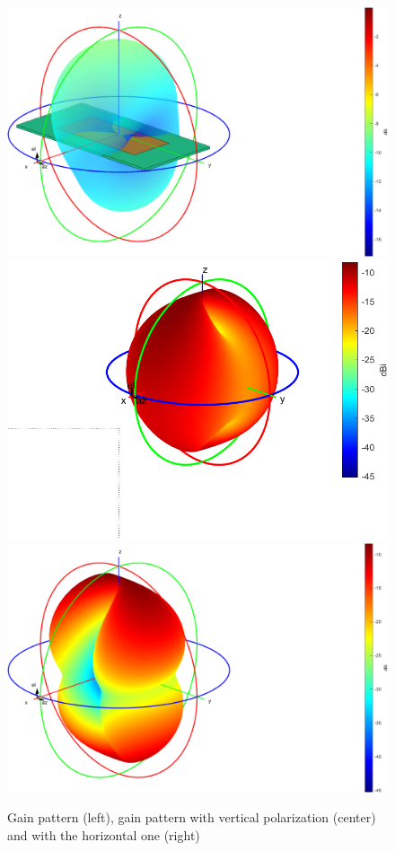 \documentclass[12pt,a4paper]{article}
\begin{document}
{\begin{center}
\begin{figure}
\includegraphics[width = 0.3\linewidth]{gain_patch.png}
\includegraphics[width = 0.3\linewidth]{gain_patch_v.png}
\includegraphics[width = 0.3\linewidth]{gain_patch_h.png}
\caption{Gain pattern (left), gain pattern with vertical polarization (center) and with the horizontal one (right)}
\end{figure}
\end{center}
\begin{multicols}{2}

\end{multicols}}
\end{document}
